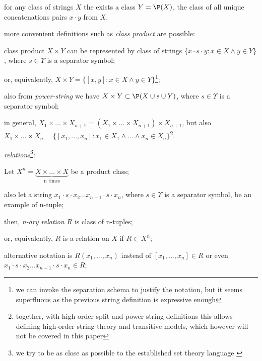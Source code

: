 \begin{definition}
\begin{legal}
\begin{legal}
\begin{legal}
        \item for any class of strings $X$ the exists a class $Y = \P(X)$, the class of all unique concatenations pairs $x \cdot y$ from $X$.
      \end{legal}
      \item more convenient definitions such as \textit{class product} are possible:
      \begin{legal}
        \item class product $X \times Y$ can be represented by class of strings $\{ x \cdot s \cdot y : x \in X \land y \in Y \}$, where $s \in \Upsilon$ is a separator symbol;
        \item or, equivalently, $X \times Y = \{[x,y] : x \in X \land y \in Y\}$\footnote{we can invoke the separation schema to justify the notation, but it seems superfluous as the previous string definition is expressive enough};
        \item also from \textit{power-string} we have $X \times Y \subset \P( X \cup s \cup Y )$, where $s \in \Upsilon$ is a separator symbol;
        \item in general, $X_1 \times \dots \times X_{n+1} = (X_1 \times \dots \times X_{n+1}) \times X_{n+1}$, but also $X_1 \times \dots \times X_{n} = \{ [x_1, ..., x_n] : x_1 \in X_1 \land ... \land x_n \in X_n\}$\footnote{together, with high-order split and power-string definitions this allows defining high-order string theory and transitive models, which however will not be covered in this paper}.
      \end{legal}
      \item \textit{relations}\footnote{we try to be as close as possible to the established set theory language \cite{jech2003set}}:
      \begin{legal}
        \item Let $X^n = \underbrace{X \times \dots \times X}_\text{n times}$ be a product class;
        \item also let a string $x_1 \cdot s \cdot x_2 ... x_{n-1} \cdot s \cdot x_n$, where $s \in \Upsilon$ is a separator symbol, be an example of n-tuple;
        \item then, \textit{n-ary relation} $R$ is class of n-tuples;
        \item or, equivalently, $R$ is a relation on $X$ if $R \subset X^n$;
        \item alternative notation is $R(x_1, ..., x_n)$ instead of $[x_1, ..., x_n] \in R$ or even $x_1 \cdot s \cdot x_2 ... x_{n-1} \cdot s \cdot x_n \in R$;

\end{legal}
\end{legal}
\end{legal}
\end{definition}
